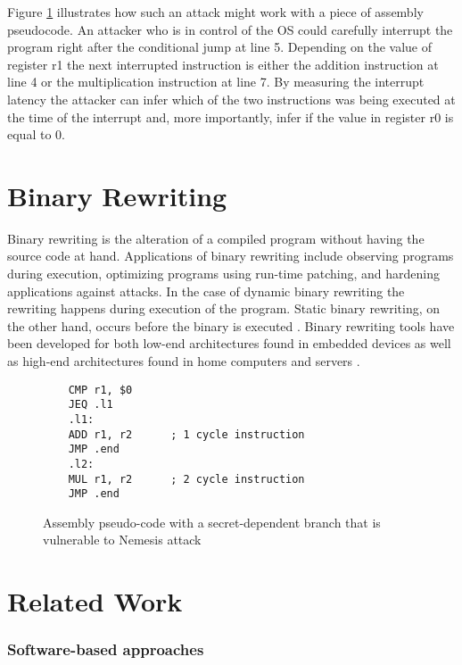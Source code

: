 Figure \ref{fig:pseudo-assembly} illustrates how such an attack might work with a piece of assembly pseudocode. An attacker who is in control of the OS could carefully interrupt the program right
after the conditional jump at line 5. Depending on the value of register r1 the next interrupted instruction is either the addition instruction at line 4 or the multiplication instruction at line 7. 
By measuring the interrupt latency the attacker can infer which of the two instructions was being executed at the time of the interrupt and, more importantly, infer if the value in register r0 is equal to 0. 

\section{Binary Rewriting}
Binary rewriting is the alteration of a compiled program without having the source code at hand. 
Applications of binary rewriting include observing programs during execution, optimizing programs using run-time patching, and 
hardening applications against attacks. In the case of dynamic binary rewriting the rewriting happens during execution of the program. 
Static binary rewriting, on the other hand, occurs before the binary is executed \cite{rewriting-survey}. 
Binary rewriting tools have been developed for both low-end architectures found in embedded devices \cite{microsbs} as well as high-end architectures found in home computers and servers 
\cite{E9Patch, instruction-punning, Dinesh2020RetroWriteSI}. 

\lstset{language=[x64]Assembler, numbers=left, stepnumber=1, frame=single}
\begin{figure}

    \begin{lstlisting}
	CMP r1, $0
	JEQ .l1
	.l1: 
	ADD r1, r2 		; 1 cycle instruction
	JMP .end
	.l2: 
	MUL r1, r2 		; 2 cycle instruction
	JMP .end
	\end{lstlisting}
	\caption{Assembly pseudo-code with a secret-dependent branch that is vulnerable to Nemesis attack}
	\label{fig:pseudo-assembly}
\end{figure}



\section{Related Work}
\subsubsection{Software-based approaches}

